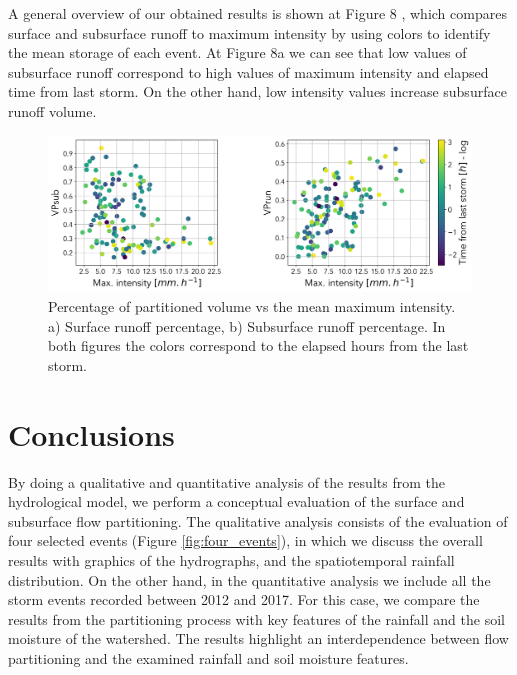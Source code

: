 \documentclass[preprint,12pt]{elsarticle}
\begin{document}
A general overview of our obtained results is shown at Figure 8 , which compares surface and subsurface runoff to maximum intensity by using colors to identify the mean storage of each event.  At Figure 8a we can see that low values of subsurface runoff correspond to high values of maximum intensity and elapsed time from last storm.  On the other hand, low intensity values increase subsurface runoff volume.

\begin{figure}[!h]
    \centering
    \includegraphics[width=14cm]{Figuras/Scatters_RainHFLS.png}
    \caption{Percentage of partitioned volume vs the mean maximum intensity. a) Surface runoff percentage, b) Subsurface runoff percentage. In both figures the colors correspond to the elapsed hours from the last storm.}
    \label{fig:VPvsIntensity}
\end{figure}

\section{Conclusions}

By doing a qualitative and quantitative analysis of the results from the hydrological model, we perform a conceptual evaluation of the surface and subsurface flow partitioning.  The qualitative analysis consists of the evaluation of four selected events (Figure \ref{fig:four_events}), in which we discuss the overall results with graphics of the hydrographs, and the spatiotemporal rainfall distribution.  On the other hand, in the quantitative analysis we include all the storm events recorded between 2012 and 2017.  For this case, we compare the results from the partitioning process with key features of the rainfall and the soil moisture of the watershed.  The results highlight an interdependence between flow partitioning and the examined rainfall and soil moisture features.\\
\end{document}

